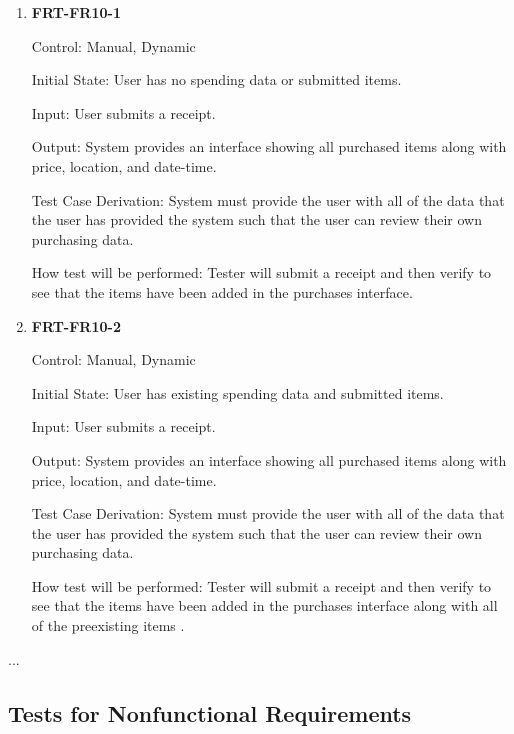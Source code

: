 \documentclass[12pt, titlepage]{article}
\begin{document}
\begin{enumerate}

\item{\textbf{FRT-FR10-1}}

Control: Manual, Dynamic
          
Initial State: User has no spending data or submitted items.

Input: User submits a receipt.
          
Output: System provides an interface showing all purchased items along with price, location, and date-time.

Test Case Derivation: System must provide the user with all of the data that the user has provided the system such that the user can review their own purchasing data.
          
How test will be performed: Tester will submit a receipt and then verify to see that the items have been added in the purchases interface.

\item{\textbf{FRT-FR10-2}}

Control: Manual, Dynamic
          
Initial State: User has existing spending data and submitted items.

Input: User submits a receipt.
          
Output: System provides an interface showing all purchased items along with price, location, and date-time.

Test Case Derivation: System must provide the user with all of the data that the user has provided the system such that the user can review their own purchasing data.
          
How test will be performed: Tester will submit a receipt and then verify to see that the items have been added in the purchases interface along with all of the preexisting items .

\end{enumerate}

...

\subsection{Tests for Nonfunctional Requirements}

\end{document}
